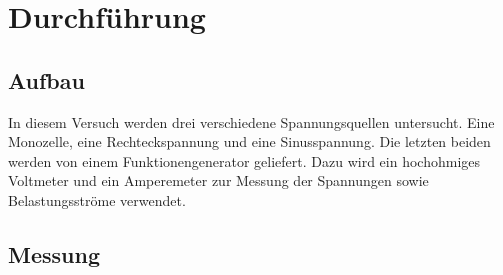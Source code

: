 
\section{Durchführung}

\subsection{Aufbau}

In diesem Versuch werden drei verschiedene Spannungsquellen untersucht.
Eine Monozelle, eine Rechteckspannung und eine Sinusspannung.  Die
letzten beiden werden von einem Funktionengenerator geliefert.  Dazu
wird ein hochohmiges Voltmeter und ein Amperemeter zur Messung der
Spannungen sowie Belastungsströme verwendet.

\subsection{Messung}
